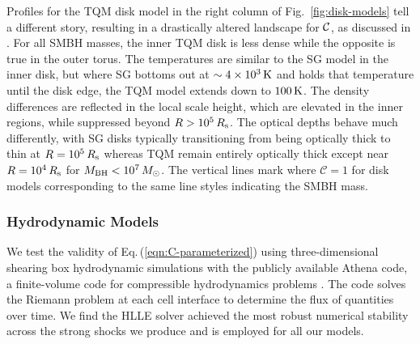 Profiles for the TQM disk model in the right column of Fig.~\ref{fig:disk-models} tell a different story, resulting in a drastically altered landscape for $\mathcal{C}$, as discussed in .
For all SMBH masses, the inner TQM disk is less dense while the opposite is true in the outer torus.
The temperatures are similar to the SG model in the inner disk, but where SG bottoms out at $\sim 4 \times 10^3\,\rm{K}$ and holds that temperature until the disk edge, the TQM model extends down to $100\,\rm{K}$.
The density differences are reflected in the local scale height, which are elevated in the inner regions, while suppressed beyond $R>10^5\,R_{\rm s}$.
The optical depths behave much differently, with SG disks typically transitioning from being optically thick to thin at $R=10^5\,R_{\rm s}$ whereas TQM remain entirely optically thick except near $R=10^4\,R_{\rm s}$ for $M_{\rm BH}<10^7\,M_{\odot}$.
The vertical lines mark where $\mathcal{C}=1$ for disk models corresponding to the same line styles indicating the SMBH mass.


\subsubsection{Hydrodynamic Models}
\label{sec:hydro}

We test the validity of Eq.\,(\ref{eqn:C-parameterized}) using three-dimensional shearing box hydrodynamic simulations with the publicly available Athena code, a finite-volume code for compressible hydrodynamics problems \citep{Stone+08, StoneGardiner10}.
The code solves the Riemann problem at each cell interface to determine the flux of quantities over time.
We find the HLLE solver \citep{Einfeldt+91} achieved the most robust numerical stability across the strong shocks we produce and is employed for all our models.

